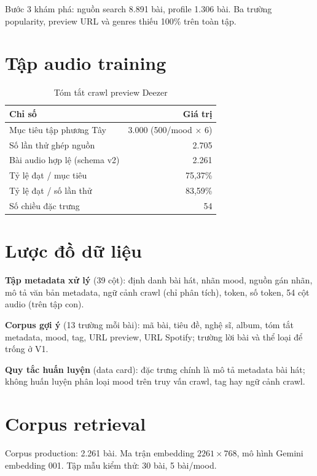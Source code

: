 Bước 3 khám phá: nguồn search 8.891 bài, profile 1.306 bài. Ba trường popularity, preview URL và genres thiếu 100\% trên toàn tập.

\section{Tập audio training}

\begin{table}[htbp]
  \centering
  \caption{Tóm tắt crawl preview Deezer}
  \label{tab:audio-summary}
  \begin{tabular}{@{}lr@{}}
    \toprule
    \textbf{Chỉ số} & \textbf{Giá trị} \\
    \midrule
    Mục tiêu tập phương Tây & 3.000 (500/mood $\times$ 6) \\
    Số lần thử ghép nguồn & 2.705 \\
    Bài audio hợp lệ (schema v2) & 2.261 \\
    Tỷ lệ đạt / mục tiêu & 75{,}37\% \\
    Tỷ lệ đạt / số lần thử & 83{,}59\% \\
    Số chiều đặc trưng & 54 \\
    \bottomrule
  \end{tabular}
\end{table}

\section{Lược đồ dữ liệu}

\textbf{Tập metadata xử lý} (39 cột): định danh bài hát, nhãn mood, nguồn gán nhãn, mô tả văn bản metadata, ngữ cảnh crawl (chỉ phân tích), token, số token, 54 cột audio (trên tập con).

\textbf{Corpus gợi ý} (13 trường mỗi bài): mã bài, tiêu đề, nghệ sĩ, album, tóm tắt metadata, mood, tag, URL preview, URL Spotify; trường lời bài và thể loại để trống ở V1.

\textbf{Quy tắc huấn luyện} (data card): đặc trưng chính là mô tả metadata bài hát; không huấn luyện phân loại mood trên truy vấn crawl, tag hay ngữ cảnh crawl.

\section{Corpus retrieval}

Corpus production: 2.261 bài. Ma trận embedding $2261 \times 768$, mô hình Gemini embedding 001. Tập mẫu kiểm thử: 30 bài, 5 bài/mood.
